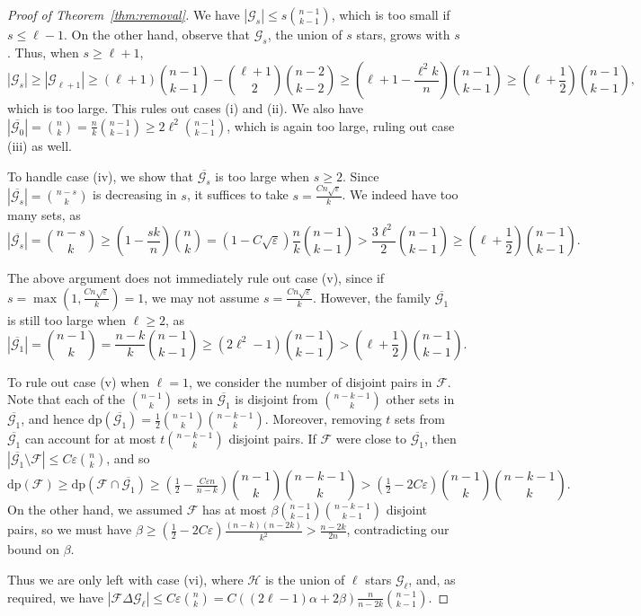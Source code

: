 \documentclass[11pt]{article}
\theoremstyle{definition}
\newcommand{\eps}{\varepsilon}
\newcommand{\cH}{\mathcal{H}}
\newcommand{\cF}{\mathcal{F}}
\newcommand{\cG}{\mathcal{G}}
\newcommand{\3}{\bf{3}}
\renewcommand{\l}{\ensuremath{\ell}}
\newcommand{\card}[1]{\left| #1 \right|}
\newcommand{\disj}{\mathrm{dp}}
\begin{document}
\begin{proof}[Proof of Theorem~\ref{thm:removal}]
We have $\card{\cG_s} \le s \binom{n-1}{k-1}$, which is too small if $s \le \l - 1$.  On the other hand, observe that $\cG_s$, the union of $s$ stars, grows with $s$.  Thus, when $s \ge \l + 1$,
\[ \card{\cG_s} \ge \card{\cG_{\l + 1}} \ge (\l + 1) \binom{n-1}{k-1} - \binom{\l + 1}{2} \binom{n-2}{k-2} \ge \left(\l + 1 - \frac{\l^2k}{n} \right) \binom{n-1}{k-1} \ge \left( \l + \frac12 \right) \binom{n-1}{k-1}, \]
which is too large.  This rules out cases (i) and (ii).  We also have $\card{\overline{\cG_0}} = \binom{n}{k} = \frac{n}{k} \binom{n-1}{k-1} \ge 2 \l^2 \binom{n-1}{k-1}$, which is again too large, ruling out case (iii) as well.

To handle case (iv), we show that $\overline{\cG_s}$ is too large when $s \ge 2$.  Since $\card{\overline{\cG_s}} = \binom{n-s}{k}$ is decreasing in $s$, it suffices to take $s = \frac{C n \sqrt{\eps}}{k}$.  We indeed have too many sets, as
\[ \card{\overline{\cG_s}} = \binom{n-s}{k} \ge \left( 1 - \frac{sk}{n} \right) \binom{n}{k} = \left( 1 - C \sqrt{\eps} \right) \frac{n}{k} \binom{n-1}{k-1} > \frac{3 \l^2}{2} \binom{n-1}{k-1} \ge \left( \l + \frac12 \right) \binom{n-1}{k-1}. \]

The above argument does not immediately rule out case (v), since if $s = \max \left( 1, \frac{C n \sqrt{\eps}}{k} \right) = 1$, we may not assume $s = \frac{C n \sqrt{\eps}}{k}$.  However, the family $\overline{\cG_1}$ is still too large when $\l \ge 2$, as
\[ \card{\overline{\cG_1}} = \binom{n-1}{k} = \frac{n-k}{k} \binom{n-1}{k-1} \ge \left( 2\l^2 - 1 \right) \binom{n-1}{k-1} > \left( \l + \frac12 \right) \binom{n-1}{k-1}. \]

To rule out case (v) when $\l = 1$, we consider the number of disjoint pairs in $\cF$.  Note that each of the $\binom{n-1}{k}$ sets in $\overline{\cG_1}$ is disjoint from $\binom{n-k-1}{k}$ other sets in $\overline{\cG_1}$, and hence $\disj(\overline{\cG_1}) = \frac12 \binom{n-1}{k} \binom{n-k-1}{k}$.  Moreover, removing $t$ sets from $\overline{\cG_1}$ can account for at most $t \binom{n-k-1}{k}$ disjoint pairs.  If $\cF$ were close to $\overline{\cG_1}$, then $\card{\overline{\cG_1} \setminus \cF} \le C\eps \binom{n}{k}$, and so
\[ \disj(\cF) \ge \disj(\cF \cap \overline{\cG_1}) \ge \left( \tfrac12 - \tfrac{C \eps n}{n-k} \right) \binom{n-1}{k} \binom{n-k-1}{k} > \left( \tfrac12 - 2C \eps \right) \binom{n-1}{k} \binom{n-k-1}{k}. \]
On the other hand, we assumed $\cF$ has at most $\beta \binom{n-1}{k-1} \binom{n-k-1}{k-1}$ disjoint pairs, so we must have $\beta \ge \left( \frac12 - 2C \eps \right) \frac{(n-k)(n-2k)}{k^2} > \frac{n-2k}{2n}$, contradicting our bound on $\beta$.

Thus we are only left with case (vi), where $\cH$ is the union of $\l$ stars $\cG_{\l}$, and, as required, we have ${\card{ \cF \Delta \cG_{\l}} \le C \eps \binom{n}{k} = C((2 \l - 1) \alpha + 2 \beta)\frac{n}{n-2k} \binom{n-1}{k-1}}$.
\end{proof}
\end{document}
